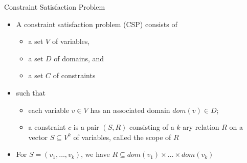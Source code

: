 \newcommand{\scope}[1]{\ensuremath{\mathit{S}(#1)}}
\newcommand{\range}[1]{\ensuremath{\mathit{R}(#1)}}
\newcommand{\project}[2]{\ensuremath{{#1}|_{#2}}}
\newcommand{\abody}[1]{\project{\mathit{body}(#1)}{\mathcal{A}}} %
\newcommand{\cbody}[1]{\project{\mathit{body}(#1)}{\mathcal{C}}} %
\newcommand{\catom}[1]{\project{\atom{#1}}{\mathcal{C}}} %
\newcommand{\aatom}[1]{\project{\atom{#1}}{\mathcal{A}}}
\begin{frame}{Constraint Satisfaction Problem}
  \bigskip
  \begin{itemize}
  \item<1-> A \alert{constraint satisfaction problem} (CSP) consists of
    \begin{itemize}
    \item a set $V$ of variables,
    \item a set $D$ of domains, and
    \item a set $C$ of constraints
    \end{itemize}
  \item<2-> [] such that
    \begin{itemize}
    \item each \alert{variable} $v\in V$ has an associated \alert{domain} $\mathit{dom}(v)\in D$\/;
    \item a \alert{constraint} $c$ is a pair
      \(
      (S,R)
      \)
      consisting of a $k$-ary \alert{relation} $R$
      on a vector $S\subseteq V^k$ of variables,
      called the \alert{scope} of $R$
    \end{itemize}
    \medskip
  \item<3-> 
    For $S=(v_1,\dots,v_k)$,
    we have
    \(
    R\subseteq\mathit{dom}(v_1)\times\dots\times\mathit{dom}(v_k)
    \)
  \end{itemize}
\end{frame}
